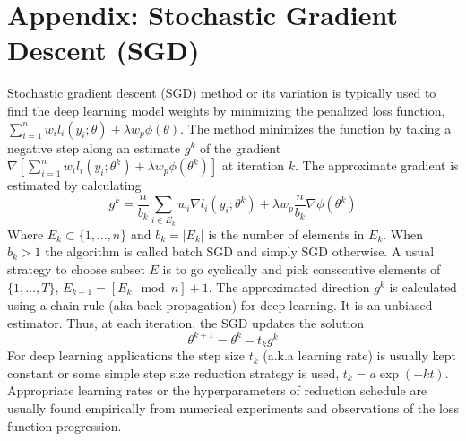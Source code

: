 \documentclass[11pt]{article}%
\begin{document}
\section{Appendix: Stochastic Gradient Descent (SGD) \label{SGD}}
Stochastic gradient descent (SGD) method or its variation  is typically used to find the deep learning model weights by minimizing the penalized loss function, $\sum_{i=1}^n w_i l_i(y_i; \theta) + \lambda w_{p} \phi(\theta)$. The method minimizes the function by taking a negative step along an estimate $g^k$ of the gradient $\nabla\left[\sum_{i=1}^n w_i l_i(y_i; \theta^k) + \lambda w_{p} \phi(\theta^k)\right] $ at iteration $k$. 
The approximate gradient is estimated by calculating 
\[
g^k = \frac{n}{b_k} \sum_{i \in E_k} w_i\nabla  l_i(y_i; \theta^k) +  \lambda w_{p} \frac{n}{b_k}\nabla \phi(\theta^k)
\]
Where $E_k \subset \{1,\ldots,n \}$ and $b_k = |E_k|$ is the number of elements in $E_k$. When $b_k >1$ the algorithm is called batch SGD and simply SGD otherwise. A usual strategy to choose subset $E$ is to go cyclically and pick consecutive elements of $\{1,\ldots,T \}$, $E_{k+1} = [E_k \mod n]+1$. The approximated direction  $g^k$ is calculated using a chain rule (aka back-propagation) for deep learning. It  is an unbiased estimator. Thus, at each iteration, the SGD updates the solution
\[
\theta^{k+1} = \theta^k - t_k g^k
\]
For deep learning applications the step size $t_k$ (a.k.a learning rate) is usually kept constant or some simple step size reduction strategy is used, $t_k = a\exp(-kt)$. Appropriate learning rates or the hyperparameters of reduction schedule  are usually found empirically from numerical experiments and observations of the loss function progression. \\
\end{document}
